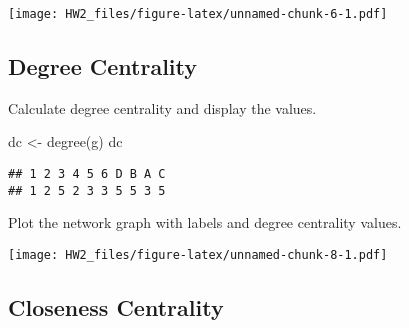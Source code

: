 \documentclass[
]{article}
\newenvironment{Shaded}{\begin{snugshade}}{\end{snugshade}}
\newcommand{\AttributeTok}[1]{\textcolor[rgb]{0.77,0.63,0.00}{#1}}
\newcommand{\CommentTok}[1]{\textcolor[rgb]{0.56,0.35,0.01}{\textit{#1}}}
\newcommand{\DecValTok}[1]{\textcolor[rgb]{0.00,0.00,0.81}{#1}}
\newcommand{\FloatTok}[1]{\textcolor[rgb]{0.00,0.00,0.81}{#1}}
\newcommand{\FunctionTok}[1]{\textcolor[rgb]{0.00,0.00,0.00}{#1}}
\newcommand{\NormalTok}[1]{#1}
\newcommand{\OtherTok}[1]{\textcolor[rgb]{0.56,0.35,0.01}{#1}}
\newcommand{\SpecialCharTok}[1]{\textcolor[rgb]{0.00,0.00,0.00}{#1}}
\newcommand{\StringTok}[1]{\textcolor[rgb]{0.31,0.60,0.02}{#1}}
\begin{document}
\texttt{[image: HW2\_files/figure-latex/unnamed-chunk-6-1.pdf]}

\hypertarget{degree-centrality}{%
\subsection{Degree Centrality}\label{degree-centrality}}

Calculate degree centrality and display the values.

\begin{Shaded}
\begin{Highlighting}[]
\NormalTok{dc }\OtherTok{\textless{}{-}} \FunctionTok{degree}\NormalTok{(g)}
\NormalTok{dc}
\end{Highlighting}
\end{Shaded}

\begin{verbatim}
## 1 2 3 4 5 6 D B A C 
## 1 2 5 2 3 3 5 5 3 5
\end{verbatim}

Plot the network graph with labels and degree centrality values.

\begin{Shaded}
\end{Shaded}

\texttt{[image: HW2\_files/figure-latex/unnamed-chunk-8-1.pdf]}

\hypertarget{closeness-centrality}{%
\subsection{Closeness Centrality}\label{closeness-centrality}}
\end{document}
